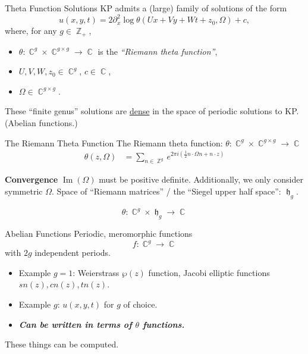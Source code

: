 \documentclass{beamer}
\DeclareMathOperator{\ZZ}{\mathbb{Z}}
\DeclareMathOperator{\CC}{\mathbb{C}}
\DeclareMathOperator{\hh}{\mathfrak{h}}
\DeclareMathOperator{\im}{\text{Im}}
\newcommand{\thetachar}[2] {\theta {\scriptsize \begin{bmatrix}#1\\#2\end{bmatrix}}}
\begin{document}
\begin{frame}{Theta Function Solutions}{}
  KP admits a (large) family of solutions of the form
  \[
  u(x,y,t) = 2 \partial_x^2 \log
  \theta(Ux + Vy + Wt + z_0, \Omega) + c,
  \]
  where, for any $g \in \ZZ_+$,
  \begin{itemize}
    \item $\theta : \CC^g \times \CC^{g \times g} \to \CC$
      is the {\it``Riemann theta function''},
    \item $U,V,W,z_0 \in \CC^g$, $c \in \CC$,
    \item $\Omega \in \CC^{g \times g}$.
  \end{itemize}

  \vspace{16pt}

  These ``finite genus'' solutions are \underline{dense} in the space of
  periodic solutions to KP. (Abelian functions.)
\end{frame}



\begin{frame}{The Riemann Theta Function}
  The Riemann theta function: $\theta : \CC^g \times \CC^{g \times g} \to \CC$
  \begin{align*}
  \theta(z,\Omega)
  &=
  \sum_{n \in \ZZ^g}
  e^{
    2 \pi i
    \left( \tfrac{1}{2} n \cdot \Omega n + n \cdot z \right)
  } %
  \end{align*}

  \begin{block}{\bf Convergence}
    $\im(\Omega)$ must be positive definite. Additionally, we only
    consider symmetric $\Omega$. Space of ``Riemann matrices'' / the
    ``Siegel upper half space'': $\hh_g$.
  \end{block}
  \[
    \theta:\CC^g \times \hh_g \to \CC
  \]
\end{frame}



\begin{frame}{Abelian Functions}{}
  Periodic, meromorphic functions
  \[
      f : \CC^g \to \CC
  \]
  with $2g$ independent periods.
  \begin{itemize}
      \item Example $g=1$: Weierstrass $\wp(z)$ function, Jacobi
        elliptic functions $sn(z), cn(z), tn(z)$.
      \item Example $g$: $u(x,y,t)$ for $g$ of choice.
      \item {\it \bf Can be written in terms of $\theta$ functions.}
  \end{itemize}

  \begin{block}{}
    These things can be computed.
  \end{block}
\end{frame}
\end{document}
